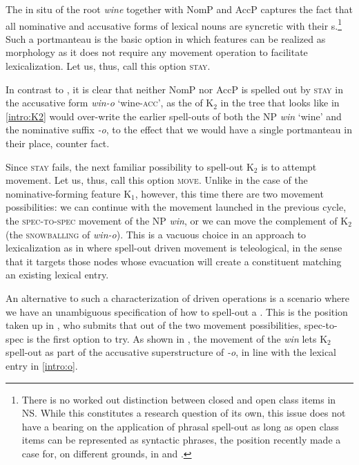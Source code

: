 \noindent
The in situ  of the root \textit{wine} together with NomP and AccP captures the fact that all nominative and accusative forms of  lexical nouns are syncretic with their s.\footnote{There is no worked out distinction between closed and open class items in  NS. While this constitutes a research question of its own, this issue does not have a bearing on the application of phrasal spell-out as long as open class items can be represented as syntactic phrases, the position recently made a case for, on different grounds, in \cite{NU} and \cite{CCW2017}.
} %
Such a portmanteau  is the basic option in which features can be realized as morphology as it does not require any movement operation to facilitate  lexicalization. Let us, thus, call this option \textsc{stay}.
\par
In contrast to , it is clear that neither NomP nor AccP is spelled out by \textsc{stay} in the  accusative form \textit{win-o} `wine-\textsc{acc}', as the  of K$_{2}$ in the tree that looks like in \ref{intro:K2} would over-write the earlier spell-outs of both the NP  \textit{win} `wine' and the nominative suffix \textit{-o}, to the effect that we would have a single portmanteau  in their place, counter fact.
\par Since \textsc{stay} fails, the next familiar possibility to spell-out K$_{2}$ is to attempt movement. Let us, thus, call this option \textsc{move}. Unlike in the case of the nominative-forming feature K$_{1}$, however, this time there are two movement possibilities: we can continue with the movement launched in the previous cycle, the \textsc{\textsc{spec-to-spec}} movement of the NP \textit{win}, or we can move the complement of K$_{2}$ (the \textsc{snowballing} of \textit{win-o}). This is a vacuous choice in an approach to lexicalization as in \cite{Caha2011} where spell-out driven movement is teleological, in the sense that it targets those nodes whose evacuation will create a constituent matching an existing lexical entry.
\par An alternative to such a characterization of  driven operations is a scenario where we have an unambiguous specification of how to spell-out a . This is the position taken up in
 \cite{Starke2018}, who submits that out of the two movement possibilities, spec-to-spec is the first option to try. As shown in \Next, the movement of the  \textit{win} lets K$_{2}$ spell-out as part of the accusative superstructure of \textit{-o}, in line with the lexical entry in \ref{intro:o}.  


